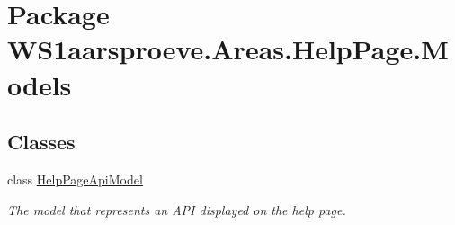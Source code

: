\hypertarget{namespace_w_s1aarsproeve_1_1_areas_1_1_help_page_1_1_models}{}\section{Package W\+S1aarsproeve.\+Areas.\+Help\+Page.\+Models}
\label{namespace_w_s1aarsproeve_1_1_areas_1_1_help_page_1_1_models}
\subsection*{Classes}
\begin{DoxyCompactItemize}
\item 
class \hyperlink{class_w_s1aarsproeve_1_1_areas_1_1_help_page_1_1_models_1_1_help_page_api_model}{Help\+Page\+Api\+Model}
\begin{DoxyCompactList}\small\item\em The model that represents an A\+P\+I displayed on the help page. \end{DoxyCompactList}\end{DoxyCompactItemize}

